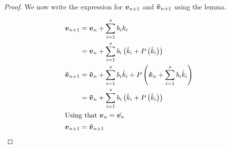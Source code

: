 \begin{proof}
We now write the expression for ${\boldsymbol {v}}_{n+1}$ and ${\boldsymbol {\tilde{v}}}_{n+1}$ using the lemma.

\begin{align*}
{\boldsymbol {v}}_{n+1}&={\boldsymbol {v}}_{n}+\sum_{i=1}^{s}b_{i}k_{i}\\
&={\boldsymbol {v}}_{n}+\sum_{i=1}^{s}b_{i}\left(\tilde{k}_{i}+P\left(\tilde{k}_{i}\right)\right)\\
{\boldsymbol {\tilde{v}}}_{n+1}&={\boldsymbol {\tilde{v}}}_{n}+\sum_{i=1}^{s}b_{i}\tilde{k}_{i}+P\left({\boldsymbol {\tilde{v}}}_{n}+\sum_{i=1}^{s}b_{i}\tilde{k}_{i}\right)\\
&={\boldsymbol {\tilde{v}}}_{n}+\sum_{i=1}^{s}b_{i}\left(\tilde{k}_{i}+P\left(\tilde{k}_{i}\right)\right)\\
\intertext{Using that ${\boldsymbol {v}}_{n}=\tilde{{\boldsymbol {v}}_{n}}$}
{\boldsymbol {v}}_{n+1}&={\boldsymbol {\tilde{v}}}_{n+1}
\end{align*}

\end{proof}

